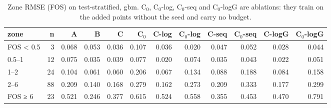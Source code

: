 \begin{table}[htbp]
\centering
\small
\setlength{\tabcolsep}{4pt}
\caption{Zone RMSE (FOS) on test-stratified, gbm. C$_0$, C$_0$-log, C$_0$-seq and C$_0$-logG are ablations: they train on the added points without the seed and carry no budget.}
\label{tab:test-stratified__log-rmse:zones:gbm}
\begin{tabular}{lrrrrrrrrrrr}
\toprule
zone & n & A & B & C & C$_0$ & C-log & C$_0$-log & C-seq & C$_0$-seq & C-logG & C$_0$-logG \\
\midrule
FOS < 0.5 & 3 & 0.068 & 0.053 & 0.036 & 0.107 & 0.036 & 0.020 & 0.047 & 0.052 & 0.028 & 0.044 \\
0.5–1 & 12 & 0.075 & 0.035 & 0.039 & 0.077 & 0.020 & 0.074 & 0.035 & 0.043 & 0.022 & 0.051 \\
1–2 & 24 & 0.104 & 0.061 & 0.060 & 0.206 & 0.067 & 0.134 & 0.088 & 0.188 & 0.084 & 0.158 \\
2–6 & 88 & 0.209 & 0.140 & 0.168 & 0.279 & 0.162 & 0.273 & 0.209 & 0.333 & 0.177 & 0.299 \\
FOS ≥ 6 & 23 & 0.521 & 0.246 & 0.377 & 0.615 & 0.524 & 0.558 & 0.355 & 0.453 & 0.470 & 0.791 \\
\bottomrule
\end{tabular}
\end{table}
